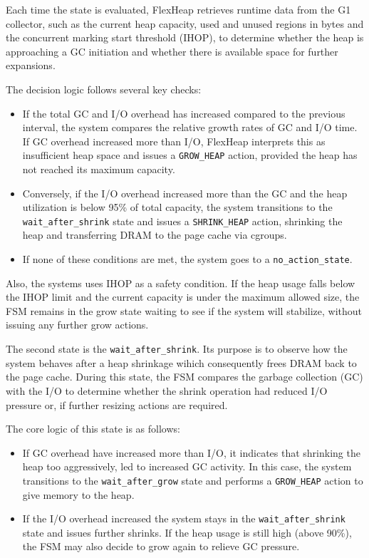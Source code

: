 Each time the state is evaluated, FlexHeap retrieves runtime data from the G1 collector,
such as the current heap capacity, used and unused regions in bytes and the concurrent marking
start threshold (IHOP), to determine whether the heap is approaching
a GC initiation and whether there is available space for further expansions.

The decision logic follows several key checks:
\begin{itemize}
	\item If the total GC and I/O overhead has increased compared to the previous interval, the system
	      compares the relative growth rates of GC and I/O time. If GC overhead increased more than I/O,
	      FlexHeap interprets this as insufficient heap space and issues a \texttt{GROW\_HEAP} action,
	      provided the heap has not reached its maximum capacity.
	\item Conversely, if the I/O overhead increased more than the GC and the heap utilization is below 95\% of
	      total capacity, the system transitions to the \texttt{wait\_after\_shrink} state and issues a
	      \texttt{SHRINK\_HEAP} action, shrinking the heap and transferring DRAM to the page cache via cgroups.
	\item If none of these conditions are met, the system goes to a \texttt{no\_action\_state}.
\end{itemize}

Also, the systems uses IHOP as a safety condition. If the heap usage falls
below the IHOP limit and the current capacity is under the maximum allowed
size, the FSM remains in the grow state waiting to see if the system will
stabilize, without issuing any further grow actions.

The second state is the \texttt{wait\_after\_shrink}. Its purpose is to observe
how the system behaves after a heap shrinkage wihich consequently frees DRAM
back to the page cache. During this state, the FSM compares the garbage
collection (GC) with the I/O to determine whether the shrink operation had
reduced I/O pressure or, if further resizing actions are required.

The core logic of this state is as follows:
\begin{itemize}

	\item
	      If GC overhead have increased more than I/O, it indicates that shrinking the heap too aggressively,
	      led to increased GC activity. In this case, the system transitions to the \texttt{wait\_after\_grow} state
	      and performs a \texttt{GROW\_HEAP} action to give memory to the heap.

	\item If the I/O overhead increased the system stays in the \texttt{wait\_after\_shrink} state and issues further shrinks.
	      If the heap usage is still high (above 90\%), the FSM may also decide to grow again to relieve GC pressure.
\end{itemize}

